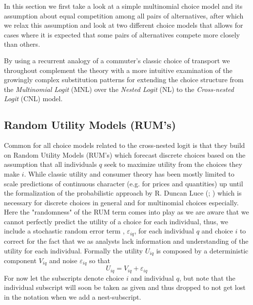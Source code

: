 In this section we first take a look at a simple multinomial choice model and its assumption about equal competition among all pairs of alternatives, after which we relax this assumption and look at two different choice models that allows for cases where it is expected that some pairs of alternatives compete more closely than others.

By using a recurrent analogy of a commuter's classic choice of transport we throughout complement the theory with a more intuitive examination of the growingly complex substitution patterns for extending the choice structure from the \textit{Multinomial Logit} (MNL) over the \textit{Nested Logit} (NL) to the \textit{Cross-nested Logit} (CNL) model.

\subsection{Random Utility Models (RUM's)}
Common for all choice models related to the cross-nested logit is that they build on Random Utility Models (RUM's) which forecast discrete choices based on the assumption that all individuals $q$ seek to maximize utility from the choices they make $i$. While classic utility and consumer theory has been mostly limited to scale predictions of continuous character (e.g. for prices and quantities) up until the formalization of the probabilistic approach by R. Duncan Luce (\citeyear{luce_theory_1957}; \citeyear{luce_probabilistic_1958}) which is necessary for discrete choices in general and for multinomial choices especially. Here the "randomness" of the RUM term comes into play as we are aware that we cannot perfectly predict the utility of a choice for each individual, thus, we include a stochastic random error term \citep{mcfadden_revealed_2005}, $\varepsilon_{iq}$, for each individual $q$ and choice $i$ to correct for the fact that we as analysts lack information and understanding of the utility for each individual. Formally the utility $U_{iq}$ is composed by a deterministic component $V_{iq}$ and noise $\varepsilon_{iq}$ so that
  \begin{equation} \label{eq: utility_general}
    U_{iq} = V_{iq} + \varepsilon_{iq}
  \end{equation}
For now let the subscripts denote choice $i$ and individual $q$, but note that the individual subscript will soon be taken as given and thus dropped to not get lost in the notation when we add a nest-subscript.
\\ \\
